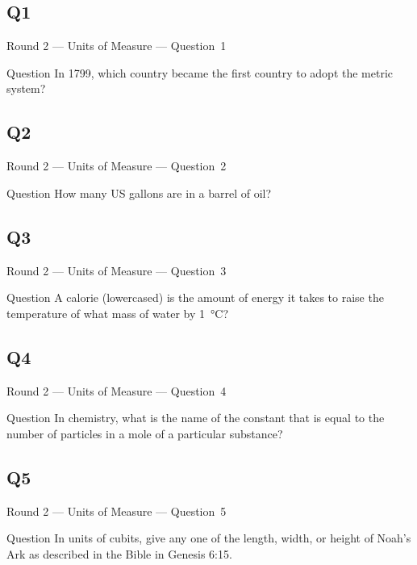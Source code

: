 \documentclass[11pt]{beamer}
\begin{document}
\subsection*{Q1}
\begin{frame}[t]{Round 2 --- Units of Measure --- \mbox{Question 1}}
\vspace{-0.5em}
\begin{block}{Question}
In 1799, which country became the first country to adopt the metric system?
\end{block}
\end{frame}
\subsection*{Q2}
\begin{frame}[t]{Round 2 --- Units of Measure --- \mbox{Question 2}}
\vspace{-0.5em}
\begin{block}{Question}
How many US gallons are in a barrel of oil?
\end{block}
\end{frame}
\subsection*{Q3}
\begin{frame}[t]{Round 2 --- Units of Measure --- \mbox{Question 3}}
\vspace{-0.5em}
\begin{block}{Question}
A calorie (lowercased) is the amount of energy it takes to raise the temperature of what mass of water by \SI{1}{\celsius}?
\end{block}
\end{frame}
\subsection*{Q4}
\begin{frame}[t]{Round 2 --- Units of Measure --- \mbox{Question 4}}
\vspace{-0.5em}
\begin{block}{Question}
In chemistry, what is the name of the constant that is equal to the number of particles in a mole of a particular substance?
\end{block}
\end{frame}
\subsection*{Q5}
\begin{frame}[t]{Round 2 --- Units of Measure --- \mbox{Question 5}}
\vspace{-0.5em}
\begin{block}{Question}
In units of cubits, give any one of the length, width, or height of Noah's Ark as described in the Bible in Genesis 6:15.
\end{block}
\end{frame}
\end{document}
